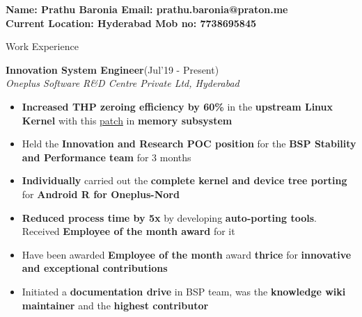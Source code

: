 \documentclass{resume}
\newcommand{\sepval}{-0.5em}
\begin{document}



{\bf Name: Prathu Baronia \hfill Email: prathu.baronia@praton.me}\\
{\bf Current Location: Hyderabad \hfill Mob no: 7738695845}



\begin{rSection}{Work Experience}

\vspace{-.4cm}
 
\item{\bf {\bf Innovation System Engineer}}\hfill{(Jul'19 - Present)}\\
	\emph{Oneplus Software R\&D Centre Private Ltd, Hyderabad}\\
[-0.4cm]

\begin{itemize}[leftmargin=*]

	\itemsep \sepval

	\item {\bf Increased THP zeroing efficiency by 60\%} in the {\bf upstream
		Linux Kernel} with this
		\href{https://github.com/hnaz/linux-mm/commit/8d9c9dbbeb54b980971085f1696758389e5d0675}{patch}
		in {\bf memory subsystem}

	\item Held the {\bf Innovation and Research POC position} for the {\bf BSP Stability
		and Performance team} for 3 months
	
	\item {\bf Individually} carried out the {\bf complete kernel and device tree
		porting} for {\bf Android R for Oneplus-Nord}
	
	\item {\bf Reduced process time by 5x} by developing {\bf auto-porting tools}. Received {\bf Employee of the month award} for
		it
		
	\item Have been awarded {\bf Employee of the month} award {\bf thrice} for {\bf innovative and exceptional
		contributions}

	\item Initiated a {\bf documentation drive} in BSP team, was the
		{\bf knowledge wiki maintainer} and the {\bf highest
		contributor}

\end{itemize}

\end{rSection}
\end{document}
